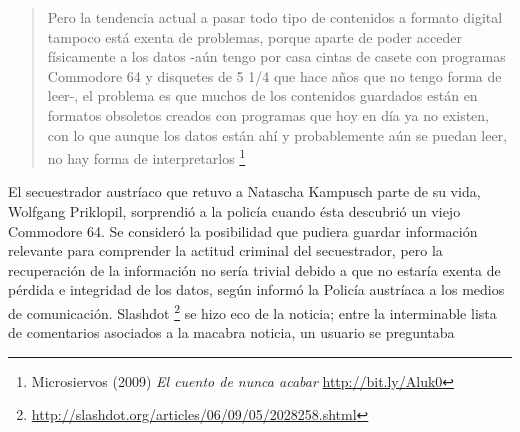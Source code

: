 \documentclass[12pt, a4paper,twoside]{book}
\begin{document}
\begin{quote}
Pero la tendencia actual a pasar todo tipo de contenidos a formato
digital tampoco está exenta de problemas, porque aparte de poder
acceder físicamente a los datos -aún tengo por casa cintas de
casete con programas Commodore 64 y disquetes de 5 1/4 que hace
años que no tengo forma de leer-, el problema es que muchos de los
contenidos guardados están en formatos obsoletos creados con
programas que hoy en día ya no existen, con lo que aunque los datos
están ahí y probablemente aún se puedan leer, no hay forma de
interpretarlos%
\footnote{Microsiervos (2009) \emph{El cuento de nunca acabar}
\href{http://www.microsiervos.com/archivo/ordenadores/vdg-el-cuento-de-nunca-acabar.html}{http://bit.ly/Aluk0}}

\end{quote}
El secuestrador austríaco que retuvo a Natascha Kampusch parte de
su vida, Wolfgang Priklopil, sorprendió a la policía cuando ésta
descubrió un viejo Commodore 64. Se consideró la posibilidad que
pudiera guardar información relevante para comprender la actitud
criminal del secuestrador, pero la recuperación de la información
no sería trivial debido a que no estaría exenta de pérdida e
integridad de los datos, según informó la Policía austríaca a los
medios de comunicación. Slashdot%
\footnote{\href{http://slashdot.org/articles/06/09/05/2028258.shtml}{http://slashdot.org/articles/06/09/05/2028258.shtml}}
se hizo eco de la noticia; entre la interminable lista de
comentarios asociados a la macabra noticia, un usuario se
preguntaba
\end{document}
